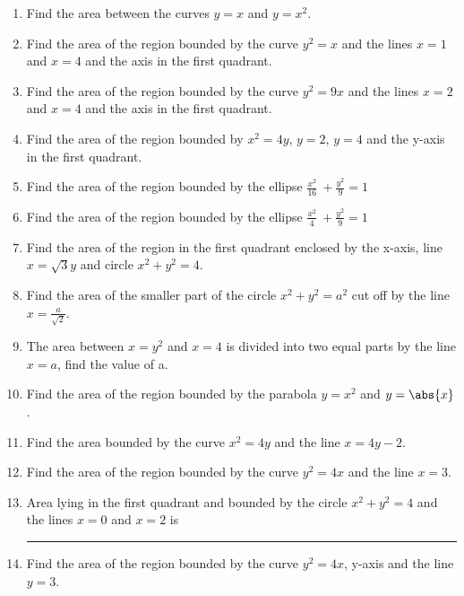 \begin{enumerate}[label=\thesubsection.\arabic*,ref=\thesubsection.\theenumi]
\item 
Find the area between the curves $y=x$ and $y=x^2$.
\\
\solution
\label{chapters/12/8/3/2}

\item 
Find the area of the region bounded by the curve $y^2=x$ and the lines $x=1$ and $x=4$ and the axis in the first quadrant.
\label{chapters/12/8/1/1}
	\\
	\solution

\item 
Find the area of the region bounded by the curve $y^2=9x$ and the lines $x=2$ and $x=4$ and the axis in the first quadrant.
\item Find the area of the region bounded by ${x}^2
= 4{y}$, ${y} = 2$, ${y} = 4$ and the y-axis in the
first quadrant.
\label{chapters/12/8/1/3}
\item Find the area of the region bounded by the ellipse \(\frac{{x}^2}{16}\ + \frac{{y}^2}{9} = 1\)
\label{chapters/12/8/1/4}
\item Find the area of the region bounded by the ellipse \(\frac{{x}^2}{4}\ + \frac{{y}^2}{9} = 1\)
\label{chapters/12/8/1/5}
\item 
		  Find the area of the region in the first quadrant enclosed by the x-axis, line $x=\sqrt{3}y$ and circle $x^2+y^2=4$.
		  \\
		  \solution
\label{chapters/12/8/1/6}

\item 
	Find the area of the smaller part of the circle $x^2+y^2=a^2 $ cut off by the line $x=\frac{a}{\sqrt{2}}$.
\item 
The area between $x = y^2$ and $x = 4$ is divided into two equal parts by the line $x = a$, find the value of a.
\item 
	Find the area of the region bounded by the parabola $y=x^2$ and $y= \abs{x}$.
\label{chapters/12/8/1/9}
\item 
Find the area bounded by the curve $x^2=4y$ and the line $x=4y-2$.
\item Find the area of the region bounded by the curve ${y}^2
= 4{x}$ and the line ${x} = 3$.
\label{chapters/12/8/1/11}
\item Area lying in the first quadrant and bounded by the circle ${x}^2 + {y}^2 = 4$ and the lines ${x} = 0$ and ${x} = 2$ is \rule{1cm}{0.1pt}
\label{chapters/12/8/1/12}
\item Find the area of the region bounded by the curve $y^2 = 4x$, y-axis and the line $y = 3$. 

\end{enumerate}
